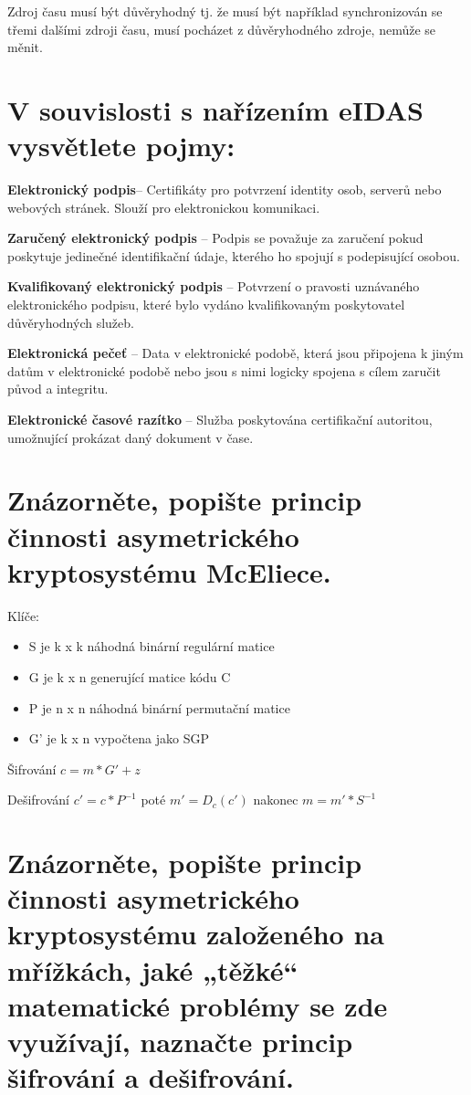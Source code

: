 Zdroj času musí být důvěryhodný tj. že musí být například synchronizován se třemi dalšími zdroji času, musí pocházet z důvěryhodného zdroje, nemůže se měnit.

\section{V souvislosti s nařízením eIDAS vysvětlete pojmy:}

\textbf{Elektronický podpis}-- Certifikáty pro potvrzení identity osob, serverů nebo webových stránek. Slouží pro elektronickou komunikaci.

\textbf{Zaručený elektronický podpis} -- Podpis se považuje za zaručení pokud poskytuje jedinečné identifikační údaje, kterého ho spojují s podepisující osobou.

\textbf{Kvalifikovaný elektronický podpis} -- Potvrzení o pravosti uznávaného elektronického podpisu, které bylo vydáno kvalifikovaným poskytovatel důvěryhodných služeb.

\textbf{Elektronická pečeť} -- Data v elektronické podobě, která jsou připojena k jiným datům v elektronické podobě nebo jsou s nimi logicky spojena s cílem zaručit původ a integritu.

\textbf{Elektronické časové razítko} -- Služba poskytována certifikační autoritou, umožnující prokázat daný dokument v čase.



\section{Znázorněte, popište princip činnosti asymetrického kryptosystému McEliece.}

Klíče:
\begin{itemize}
    \item S je k x k náhodná binární regulární matice
    \item G je k x n generující matice kódu C
    \item P je n x n náhodná binární permutační matice
    \item G' je k x n vypočtena jako SGP
\end{itemize}

Šifrování $c = m * G' + z$

Dešifrování $c' = c * P^{-1}$ poté $m' = D_c(c')$ nakonec $m = m' * S^{-1}$

\section{Znázorněte, popište princip činnosti asymetrického kryptosystému založeného na mřížkách, jaké „těžké“ matematické problémy se zde využívají, naznačte princip šifrování a dešifrování.}

